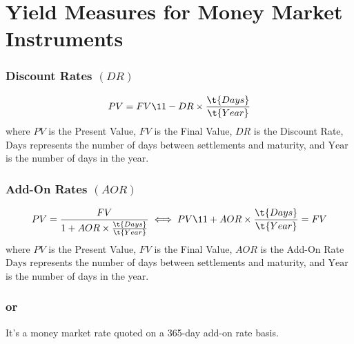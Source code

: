 \documentclass[12pt,article]{memoir}
\begin{document}
\section{Yield Measures for Money Market Instruments}

\subsubsection{Discount Rates $(DR)$}
$$
PV = FV \1{1- DR \times \frac{\t{Days}}{\t{Year}}}
$$
where $PV$ is the Present Value, $FV$ is the Final Value, $DR$ is the Discount Rate, $\text{Days}$ represents the number of days between settlements and maturity, and $\text{Year}$ is the number of days in the year.

\subsubsection{Add-On Rates $(AOR)$}
$$
PV = \frac{FV}{1+AOR\times\frac{\t{Days}}{\t{Year}}} 
\iff 
PV \1{1+AOR\times\frac{\t{Days}}{\t{Year}}} = FV
$$
where $PV$ is the Present Value, $FV$ is the Final Value, $AOR$ is the Add-On Rate $\text{Days}$ represents the number of days between settlements and maturity, and $\text{Year}$ is the number of days in the year.

\subsubsection{ or }
It's a money market rate quoted on a 365-day add-on rate basis. 
\end{document}
